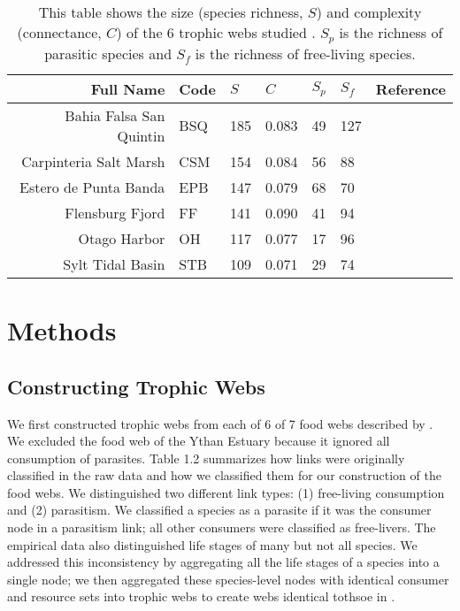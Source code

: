 \documentclass[../dissertation.tex]{subfiles}
\begin{document}
 \begin{table}
    \centering
    \begin{tabular}{r l l l l l l }
        \toprule
        Full Name               &Code       &$S$    &$C$    &$S_p$  &$S_f$  &Reference\\
        \midrule 
        Bahia Falsa San Quintin &BSQ        &185    &0.083  &49     &127&\cite{Hechinger2011}\\
        Carpinteria Salt Marsh  &CSM        &154    &0.084  &56     &88 &\cite{Hechinger2011}\\
        Estero de Punta Banda   &EPB        &147    &0.079  &68     &70 &\cite{Hechinger2011}\\
        Flensburg Fjord         &FF         &141    &0.090  &41     &94 &\cite{Zander2011}\\
        Otago Harbor            &OH         &117    &0.077  &17     &96&\cite{Mouritsen2006}\\
        Sylt Tidal Basin        &STB        &109    &0.071  &29     &74&\cite{Thieltges2005}\\
        \bottomrule
    \end{tabular}
    \caption{This table shows the size (species richness, $S$) and complexity
        (connectance, $C$) of the 6 trophic webs studied \cite{Dunne2013}. $S_p$ is the richness of
    parasitic species and $S_f$ is the richness of free-living species.
    \label{tab:foodWebSummary}}
\end{table}


\section{Methods} 

\subsection{Constructing Trophic Webs} We first constructed trophic webs from
each of 6 of 7 food webs described by \cite{Dunne2013}. We excluded the food
web of the Ythan Estuary because it ignored all consumption of parasites. Table
1.2 summarizes how links were originally classified in the raw data and how we
classified them for our construction of the food webs. We distinguished two
different link types: (1) free-living consumption and (2) parasitism. We
classified a species as a parasite if it was the consumer node in a parasitism
link; all other consumers were classified as free-livers. The empirical data
also distinguished life stages of many but not all species. We addressed this
inconsistency by aggregating all the life stages of a species into a single
node; we then aggregated these species-level nodes with identical consumer and
resource sets into trophic webs to create webs identical tothsoe in
\cite{Dunne2013}. 
\end{document}
